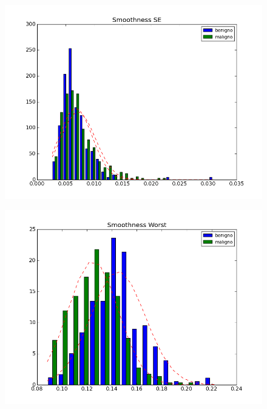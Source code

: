 \documentclass[11pt,a4paper]{article}
\numberwithin{equation}{section}
\begin{document}
\begin{itemize}
\begin{figure}[H]
\centering
\begin{minipage}{.5\textwidth}
  \centering
  \includegraphics[width=\linewidth]{../img/hist/smoothness_se}
  \label{fig:test1}
\end{minipage}%
\begin{minipage}{.5\textwidth}
  \centering
  \includegraphics[width=\linewidth]{../img/hist/smoothness_worst}
  \label{fig:test2}
\end{minipage}
\end{figure}


\end{itemize}
\end{document}
